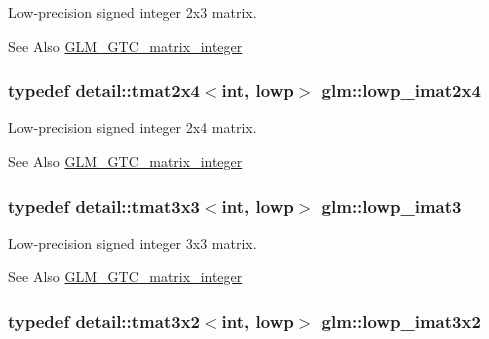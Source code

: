 Low-\/precision signed integer 2x3 matrix. \begin{DoxySeeAlso}{See Also}
\hyperlink{group__gtc__matrix__integer}{G\-L\-M\-\_\-\-G\-T\-C\-\_\-matrix\-\_\-integer} 
\end{DoxySeeAlso}
\hypertarget{group__gtc__matrix__integer_ga4d859ef48cdfb15b2c9acc98064dd272}{
\subsubsection[{lowp\-\_\-imat2x4}]{\setlength{\rightskip}{0pt plus 5cm}typedef detail\-::tmat2x4$<$int, lowp$>$ {\bf glm\-::lowp\-\_\-imat2x4}}}\label{group__gtc__matrix__integer_ga4d859ef48cdfb15b2c9acc98064dd272}
Low-\/precision signed integer 2x4 matrix. \begin{DoxySeeAlso}{See Also}
\hyperlink{group__gtc__matrix__integer}{G\-L\-M\-\_\-\-G\-T\-C\-\_\-matrix\-\_\-integer} 
\end{DoxySeeAlso}
\hypertarget{group__gtc__matrix__integer_ga149b90591e7275193c85cc08acbf0024}{
\subsubsection[{lowp\-\_\-imat3}]{\setlength{\rightskip}{0pt plus 5cm}typedef detail\-::tmat3x3$<$int, lowp$>$ {\bf glm\-::lowp\-\_\-imat3}}}\label{group__gtc__matrix__integer_ga149b90591e7275193c85cc08acbf0024}
Low-\/precision signed integer 3x3 matrix. \begin{DoxySeeAlso}{See Also}
\hyperlink{group__gtc__matrix__integer}{G\-L\-M\-\_\-\-G\-T\-C\-\_\-matrix\-\_\-integer} 
\end{DoxySeeAlso}
\hypertarget{group__gtc__matrix__integer_ga250780f2be05f698b881b04ba7ce0452}{
\subsubsection[{lowp\-\_\-imat3x2}]{\setlength{\rightskip}{0pt plus 5cm}typedef detail\-::tmat3x2$<$int, lowp$>$ {\bf glm\-::lowp\-\_\-imat3x2}}}\label{group__gtc__matrix__integer_ga250780f2be05f698b881b04ba7ce0452}
